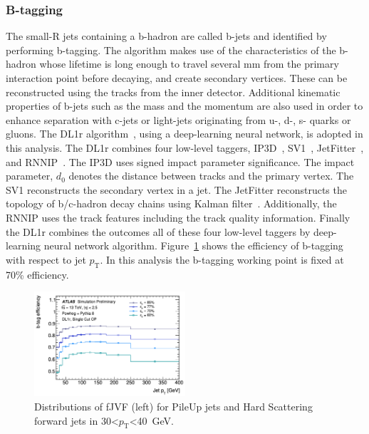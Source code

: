 \subsubsection{B-tagging}
The small-R jets containing a b-hadron are called b-jets and identified by performing b-tagging.
The algorithm makes use of the characteristics of the b-hadron whose lifetime is long enough to travel several mm from the primary interaction point before decaying, and create secondary vertices. These can be reconstructed using the tracks from the inner detector.
Additional kinematic properties of b-jets such as the mass and the momentum are also used in order to enhance separation with c-jets or light-jets originating from u-, d-, s- quarks or gluons.
The DL1r algorithm~\cite{ATL-PHYS-PUB-2020-009}, using a deep-learning neural network, is adopted in this analysis.
The DL1r combines four low-level taggers, IP3D~\cite{ATL-PHYS-PUB-2017-013}, SV1~\cite{ATL-PHYS-PUB-2017-011}, JetFitter~\cite{ATL-PHYS-PUB-2018-025}, and RNNIP~\cite{ATL-PHYS-PUB-2017-003}.
The IP3D uses signed impact parameter significance. The impact parameter, $d_0$ denotes the distance between tracks and the primary vertex.
The SV1 reconstructs the secondary vertex in a jet. The JetFitter reconstructs the topology of b/c-hadron decay chains using Kalman filter~\cite{FRUHWIRTH1987444}.
Additionally, the RNNIP uses the track features including the track quality information.
Finally the DL1r combines the outcomes all of these four low-level taggers by deep-learning neural network algorithm.
Figure~\ref{fig:btageff} shows the efficiency of b-tagging with respect to jet $p_\mathrm{T}$.
In this analysis the b-tagging working point is fixed at 70\% efficiency.
\begin{figure}[tbp]
    \begin{center}
    \includegraphics[width=0.50\textwidth,keepaspectratio]{figures/Reconstruction/btageff}
    \caption{
    Distributions of fJVF (left) for PileUp jets and Hard Scattering forward jets in 30<$p_\mathrm{T}$<40~GeV. \cite{ATL-PHYS-PUB-2020-009}
    }
    \label{fig:btageff}
    \end{center}
\end{figure}
